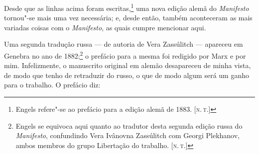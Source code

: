 Desde que as linhas acima foram escritas,\footnote{ Engels refere"-se
ao prefácio para a edição alemã de 1883. [\textsc{n.\,t.}]}  uma nova
edição alemã do \textit{Manifesto} tornou"-se mais uma vez necessária;
e, desde então, também aconteceram as mais variadas coisas com o
\textit{Manifesto}, as quais cumpre mencionar aqui. 

Uma segunda tradução russa --- de autoria de Vera Zassúlitch --- apareceu
em Genebra no ano de 1882;\footnote{Engels se equivoca aqui quanto ao
tradutor desta segunda edição russa do \textit{Manifesto}, confundindo
Vera Ivânovna Zassúlitch com Georgi Plekhanov, ambos membros do grupo
Libertação do trabalho. [\textsc{n.\,t.}]}  o prefácio para a
mesma foi redigido por Marx e por mim. Infelizmente, o manuscrito
original em alemão desapareceu de minha vista, de modo que tenho de
retraduzir do russo, o que de modo algum será um ganho para o trabalho.
O prefácio diz:

